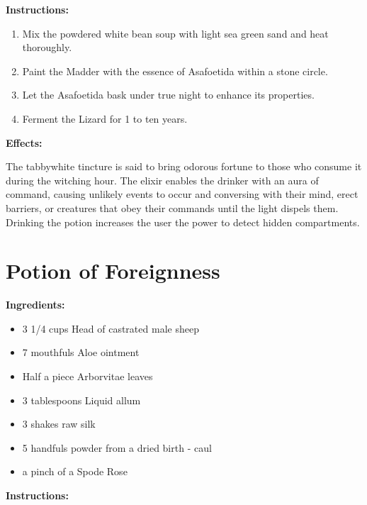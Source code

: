 \documentclass{article}
\begin{document}
\textbf{Instructions:}

\begin{enumerate}
  \item Mix the powdered white bean soup with light sea green sand and heat thoroughly.
  \item Paint the Madder with the essence of Asafoetida within a stone circle.
  \item Let the Asafoetida bask under true night to enhance its properties.
  \item Ferment the Lizard for 1 to ten years.
\end{enumerate}

\textbf{Effects:}

The tabbywhite tincture is said to bring odorous fortune to those who consume it during the witching hour. The elixir enables the drinker with an aura of command, causing unlikely events to occur and conversing with their mind, erect barriers, or creatures that obey their commands until the light dispels them. Drinking the potion increases the user the power to detect hidden compartments.

\newpage
\section*{Potion of Foreignness}

\textbf{Ingredients:}

\begin{itemize}
  \item 3 1/4 cups Head of castrated male sheep
  \item 7 mouthfuls Aloe ointment
  \item Half a piece Arborvitae leaves
  \item 3 tablespoons Liquid allum
  \item 3 shakes raw silk
  \item 5 handfuls powder from a dried birth - caul
  \item a pinch of a Spode Rose
\end{itemize}

\textbf{Instructions:}
\end{document}
